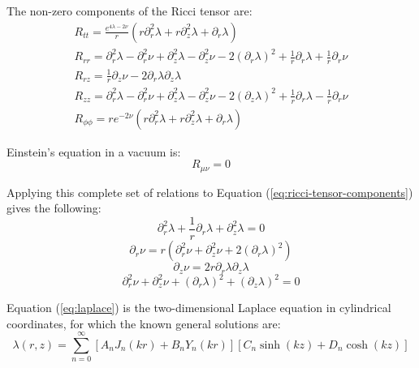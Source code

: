 \documentclass{article}
\begin{document}
The non-zero components of the Ricci tensor are:
\begin{equation}
\begin{array}{l}
R_{tt}=\frac{e^{4\lambda-2\nu}}{r}\left(r\partial^{2}_{r}\lambda+r\partial^{2}_{z}\lambda+\partial_{r}\lambda\right)\\
R_{rr}=\partial^{2}_{r}\lambda-\partial^{2}_{r}\nu+\partial^{2}_{z}\lambda-\partial^{2}_{z}\nu-2\left(\partial_{r}\lambda\right)^{2}+\frac{1}{r}\partial_{r}\lambda+\frac{1}{r}\partial_{r}\nu\\
R_{rz}=\frac{1}{r}\partial_{z}\nu-2\partial_{r}\lambda\partial_{z}\lambda\\
R_{zz}=\partial^{2}_{r}\lambda-\partial^{2}_{r}\nu+\partial^{2}_{z}\lambda-\partial^{2}_{z}\nu-2\left(\partial_{z}\lambda\right)^{2}+\frac{1}{r}\partial_{r}\lambda-\frac{1}{r}\partial_{r}\nu\\
R_{\phi\phi}=re^{-2\nu}\left(r\partial^{2}_{r}\lambda+r\partial^{2}_{z}\lambda+\partial_{r}\lambda\right)
\end{array}\label{eq:ricci-tensor-components}
\end{equation}

Einstein's equation in a vacuum is:
\begin{equation}
R_{\mu\nu}=0\label{eq:vacuum-solutions}
\end{equation}

Applying this complete set of relations to Equation (\ref{eq:ricci-tensor-components}) gives the following:
\begin{equation}
\partial^{2}_{r}\lambda+\frac{1}{r}\partial_{r}\lambda+\partial^{2}_{z}\lambda=0\label{eq:laplace}
\end{equation}
\begin{equation}
\partial_{r}\nu=r\left(\partial^{2}_{r}\nu+\partial^{2}_{z}\nu+2\left(\partial_{r}\lambda\right)^{2}\right)\label{eq:R_rr=0}
\end{equation}
\begin{equation}
\partial_{z}\nu=2r\partial_{r}\lambda\partial_{z}\lambda\label{eq:nu_z}
\end{equation}
\begin{equation}
\partial^{2}_{r}\nu+\partial^{2}_{z}\nu+\left(\partial_{r}\lambda\right)^{2}+\left(\partial_{z}\lambda\right)^{2}=0\label{eq:R_phiphi=0}
\end{equation}

Equation (\ref{eq:laplace}) is the two-dimensional Laplace equation in cylindrical coordinates, for which the known general solutions are:
\begin{equation}
\lambda (r,z)=\sum^{\infty}_{n=0}[A_{n}J_{n}\left(kr\right)+B_{n}Y_{n}\left(kr\right)][C_{n}\sinh(kz)+D_{n}\cosh(kz)]\label{eq:laplace_sol}
\end{equation}
\end{document}
